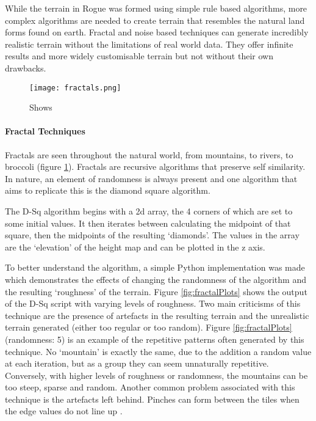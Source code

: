 \documentclass[a4paper]{report}
\begin{document}
While the terrain in Rogue was formed using simple rule based algorithms, more complex algorithms are needed to create terrain that resembles the natural land forms found on earth. Fractal and noise based techniques can generate incredibly realistic terrain without the limitations of real world data. They offer infinite results and more widely customisable terrain but not without their own drawbacks.

\begin{figure}[H]
    \centering
        \texttt{[image: fractals.png]}
        \caption{Shows }
        \label{fig:fractals}
\end{figure}

\paragraph{Fractal Techniques}

Fractals are seen throughout the natural world, from mountains, to rivers, to broccoli (figure \ref{fig:fractals}). Fractals are recursive algorithms that preserve self similarity. In nature, an element of randomness is always present and one algorithm that aims to replicate this is the diamond square algorithm.

The D-Sq algorithm begins with a 2d array, the 4 corners of which are set to some initial values. It then iterates between calculating the midpoint of that square, then the midpoints of the resulting `diamonds'. The values in the array are the `elevation' of the height map and can be plotted in the z axis.

To better understand the algorithm, a simple Python implementation was made which demonstrates the effects of changing the randomness of the algorithm and the resulting `roughness' of the terrain. Figure \ref{fig:fractalPlots} shows the output of the D-Sq script with varying levels of roughness. Two main criticisms of this technique are the presence of artefacts in the resulting terrain and the unrealistic terrain generated (either too regular or too random)\cite{Dsq}. Figure \ref{fig:fractalPlots}(randomness: 5) is an example of the repetitive patterns often generated by this technique. No `mountain' is exactly the same, due to the addition a random value at each iteration, but as a group they can seem unnaturally repetitive. Conversely, with higher levels of roughness or randomness, the mountains can be too steep, sparse and random. Another common problem associated with this technique is the artefacts left behind. Pinches can form between the tiles when the edge values do not line up \cite{proGen}.
\end{document}
